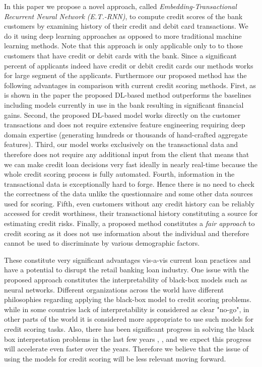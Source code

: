 \documentclass[sigconf]{acmart}
\begin{document}
In this paper we propose a novel approach, called \textit{Embedding-Transactional Recurrent Neural Network (E.T.-RNN)}, to compute credit scores of the bank customers by examining history of their credit and debit card transactions.
We do it using deep learning approaches as opposed to more traditional machine learning methods.
Note that this approach is only applicable only to to those customers that have credit or debit cards with the bank. Since a significant percent of applicants indeed have credit or debit credit cards our methods works for large segment of the applicants. Furthermore our proposed method has the following advantages in comparison with current credit scoring methods.
First, as is shown in the paper the proposed DL-based method outperforms the baselines including models currently in use in the bank resulting in significant financial gains.
Second, the proposed DL-based model works directly on the customer transactions and does not require extensive feature engineering requiring deep domain expertise (generating hundreds or thousands of hand-crafted aggregate features).
Third, our model works exclusively on the transactional data and therefore does not require any additional input from the client that means that we can make credit loan decisions very fast ideally in nearly real-time because the whole credit scoring process is fully automated.
Fourth, information in the transactional data is exceptionally hard to forge. Hence there is no need to check the correctness of the data unlike the questionnaire and some other data sources used for scoring.
Fifth, even customers without any credit history can be reliably accessed for credit worthiness, their transactional history constituting a source for estimating credit risks.
Finally, a proposed method  constitutes a \textit{fair approach} to credit scoring as it does not use information about the individual and therefore cannot be used to discriminate by various demographic factors.

These constitute very significant advantages vis-a-vis current loan practices and have a potential to disrupt the retail banking loan industry. One issue with the proposed approach constitutes the interpretability of black-box models such as neural networks.
Different organizations across the world have different philosophies regarding applying the black-box model to credit scoring problems. while in some countries lack of interpretability is considered as clear "no-go", in other parts of the world it is considered more appropriate to use such models for credit scoring tasks. Also, there has been significant progress in solving the black box interpretation problems in the last few years \cite{DBLP:journals/corr/ChoiBSSS16}, \cite{gupta2018lisa}, \cite{mccoy2018rnns} and we expect this progress will accelerate even faster over the years. Therefore we believe that the issue of using the models for credit scoring will be less relevant moving forward.
\end{document}
